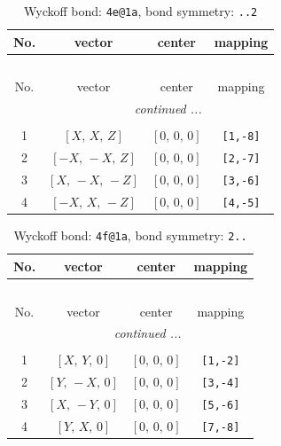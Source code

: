 \documentclass[fleqn,8pt]{jsarticle}
\begin{document}
\renewcommand{\arraystretch}{1.2}
\begin{longtable}{cccc}
\caption{Wyckoff bond: {\tt 4e@1a}, bond symmetry: {\tt ..2}}
 \\
 \hline \hline
No. & vector & center & mapping \\ \hline \endfirsthead

\multicolumn{3}{l}{\tablename\ \thetable{}} \\
 \hline \hline
No. & vector & center & mapping \\ \hline \endhead

 \hline \hline
\multicolumn{3}{r}{\footnotesize\it continued ...} \\ \endfoot

 \hline \hline
\multicolumn{3}{r}{} \\ \endlastfoot

1 & $\left[ X,\, X,\, Z \right]$ & $\left[ 0,\, 0,\, 0 \right]$ & {\tt [1,-8]} \\ \hline
2 & $\left[ - X,\, - X,\, Z \right]$ & $\left[ 0,\, 0,\, 0 \right]$ & {\tt [2,-7]} \\ \hline
3 & $\left[ X,\, - X,\, - Z \right]$ & $\left[ 0,\, 0,\, 0 \right]$ & {\tt [3,-6]} \\ \hline
4 & $\left[ - X,\, X,\, - Z \right]$ & $\left[ 0,\, 0,\, 0 \right]$ & {\tt [4,-5]} \\
\end{longtable}
\renewcommand{\arraystretch}{1.2}
\begin{longtable}{cccc}
\caption{Wyckoff bond: {\tt 4f@1a}, bond symmetry: {\tt 2..}}
 \\
 \hline \hline
No. & vector & center & mapping \\ \hline \endfirsthead

\multicolumn{3}{l}{\tablename\ \thetable{}} \\
 \hline \hline
No. & vector & center & mapping \\ \hline \endhead

 \hline \hline
\multicolumn{3}{r}{\footnotesize\it continued ...} \\ \endfoot

 \hline \hline
\multicolumn{3}{r}{} \\ \endlastfoot

1 & $\left[ X,\, Y,\, 0 \right]$ & $\left[ 0,\, 0,\, 0 \right]$ & {\tt [1,-2]} \\ \hline
2 & $\left[ Y,\, - X,\, 0 \right]$ & $\left[ 0,\, 0,\, 0 \right]$ & {\tt [3,-4]} \\ \hline
3 & $\left[ X,\, - Y,\, 0 \right]$ & $\left[ 0,\, 0,\, 0 \right]$ & {\tt [5,-6]} \\ \hline
4 & $\left[ Y,\, X,\, 0 \right]$ & $\left[ 0,\, 0,\, 0 \right]$ & {\tt [7,-8]} \\
\end{longtable}
\end{document}
